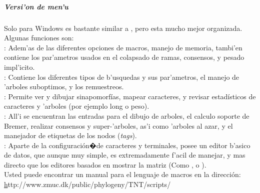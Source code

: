 \subparagraph*{Versi'on de men'u}
Solo para Windows es bastante similar a , pero esta mucho mejor organizada. Algunas funciones son:\\
: Adem'as de las diferentes opciones de macros, manejo de memoria, tambi'en contiene los par'ametros usados en el colapsado de ramas, consensos, y pesado impl'icito.\\
: Contiene los diferentes tipos de b'usquedas y sus par'ametros, el manejo de 'arboles suboptimos, y los remuestreos.\\
: Permite ver y dibujar sinapomorf\'ias, mapear caracteres, y revisar estad\'isticos de caracteres y 'arboles (por ejemplo long o peso).\\
: All'i se encuentran las entradas para el dibujo de arboles, el calculo soporte de Bremer, realizar consensos y super-'arboles, as'i como 'arboles al azar, y el manejador de etiquetas de los nodos (\textit{tags}).\\
: Aparte de la configuraci\'on�de caracteres y terminales, posee un editor b'asico de datos, que aunque muy simple, es extremadamente f'acil de manejar, y mas directo que los editores basados en mostrar la matriz (Como , o ).\\
Usted puede encontrar un manual para el lenguaje de macros en la direcci\'on:\\ 
\href{}http://www.zmuc.dk/public/phylogeny/TNT/scripts/